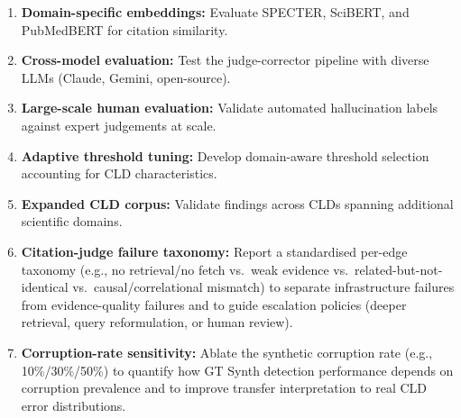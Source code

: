 \begin{enumerate}[noitemsep]
    \item \textbf{Domain-specific embeddings:} Evaluate SPECTER, SciBERT, and PubMedBERT for citation similarity.
    \item \textbf{Cross-model evaluation:} Test the judge-corrector pipeline with diverse LLMs (Claude, Gemini, open-source).
    \item \textbf{Large-scale human evaluation:} Validate automated hallucination labels against expert judgements at scale.
    \item \textbf{Adaptive threshold tuning:} Develop domain-aware threshold selection accounting for CLD characteristics.
    \item \textbf{Expanded CLD corpus:} Validate findings across CLDs spanning additional scientific domains.
    \item \textbf{Citation-judge failure taxonomy:} Report a standardised per-edge taxonomy (e.g., no retrieval/no fetch vs.\ weak evidence vs.\ related-but-not-identical vs.\ causal/correlational mismatch) to separate infrastructure failures from evidence-quality failures and to guide escalation policies (deeper retrieval, query reformulation, or human review).
    \item \textbf{Corruption-rate sensitivity:} Ablate the synthetic corruption rate (e.g., 10\%/30\%/50\%) to quantify how GT Synth detection performance depends on corruption prevalence and to improve transfer interpretation to real CLD error distributions.
\end{enumerate}
